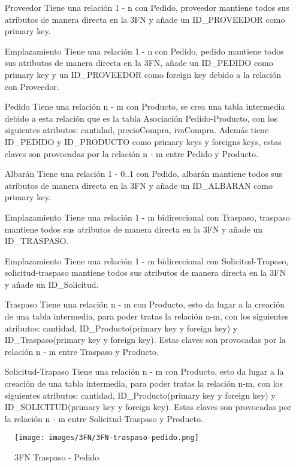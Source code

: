 \begin{itemize}
	\item [Proveedor] Tiene una relación 1 - n con Pedido, proveedor mantiene todos sus atributos de manera directa en la 3FN y añade un ID\_PROVEEDOR como primary key.
	\item [Emplazamiento] Tiene una relación 1 - n con Pedido, pedido mantiene todos sus atributos de manera directa  en la 3FN, añade un ID\_PEDIDO como primary key y un
	ID\_PROVEEDOR como foreign key debido a la relación con Proveedor.
	\item [Pedido] Tiene una relación n - m con Producto, se crea una tabla intermedia debido a esta relación que es la tabla Asociación Pedido-Producto, con los
	siguientes atributos: cantidad, precioCompra, ivaCompra. Además tiene ID\_PEDIDO y ID\_PRODUCTO como primary keys y foreigns keys, estas claves son provocadas
	por la relación n - m entre Pedido y Producto.
	\item[Albarán] Tiene una relación 1 - 0..1 con Pedido, albarán mantiene todos sus atributos de manera directa en la 3FN y añade un ID\_ALBARAN como primary key.
	\item[Emplazamiento] Tiene una relación 1 - m bidireccional con Traspaso, traspaso mantiene todos sus atributos de manera directa en la 3FN y añade un ID\_TRASPASO.
	
	\item[Emplazamiento] Tiene una relación 1 - m bidireccional con Solicitud-Trapaso, solicitud-traspaso mantiene todos sus atributos de manera directa en la 3FN
	y añade un ID\_Solicitud.
	\item[Traspaso] Tiene una relación n - m con Producto, esto da lugar a la creación de una tabla intermedia, para poder tratas la relación n-m, con los siguientes
	atributos: cantidad, ID\_Producto(primary key y foreign key) y ID\_Traspaso(primary key y foreign key). Estas claves son provocadas por la relación n - m
	entre Traspaso y Producto.
	\item[Solicitud-Trapaso] Tiene una relación n - m con Producto, esto da lugar a la creación de una tabla intermedia, para poder tratas la relación n-m, con los siguientes
	atributos: cantidad, ID\_Producto(primary key y foreign key) y ID\_SOLICITUD(primary key y foreign key). Estas claves son provocadas por la relación n - m
	entre Solicitud-Traspaso y Producto.
	
\end{itemize}

\begin{figure}[H]
	\texttt{[image: images/3FN/3FN-traspaso-pedido.png]}
	\caption{3FN Traspaso - Pedido}
\end{figure}

